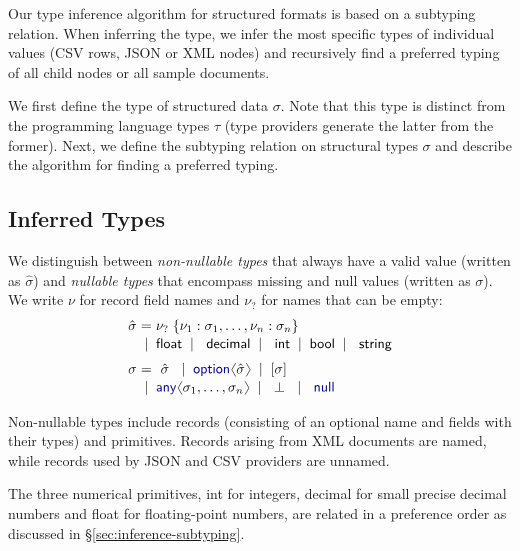 \documentclass[10pt,preprint,blind,clearpagebib]{sigplanconf}
\newcommand{\langl}{\begin{picture}(4.5,7)
\put(1.1,2.5){\rotatebox{60}{\line(1,0){5.5}}}
\put(1.1,2.5){\rotatebox{300}{\line(1,0){5.5}}}
\end{picture}}
\newcommand{\rangl}{\begin{picture}(4.5,7)
\put(.9,2.5){\rotatebox{120}{\line(1,0){5.5}}}
\put(.9,2.5){\rotatebox{240}{\line(1,0){5.5}}}
\end{picture}}
\newcommand{\kvd}[1]{\textnormal{\textcolor{kvdclr}{\sffamily #1}}}
\newcommand{\ident}[1]{\textnormal{\sffamily #1}}
\newcommand{\lsep}[0]{\;\; | \;\;}
\newcommand{\narrow}[1]{\hspace{-0.7em} #1 \hspace{-0.7em}}
\begin{document}
Our type inference algorithm for structured formats is based on a subtyping relation. When 
inferring the type, we infer the most specific types of individual values (CSV rows, JSON or XML 
nodes) and recursively find a preferred typing of all child nodes or all sample documents.

We first define the type of structured data $\sigma$. Note that this type is distinct 
from the programming language types $\tau$ (type providers generate the latter from the former). 
Next, we define the subtyping relation on structural types $\sigma$ and describe the algorithm 
for finding a preferred typing. 

\subsection{Inferred Types}
\label{sec:inference-types}

We distinguish between \emph{non-nullable types} that always have a valid value (written as 
$\hat{\sigma}$) and \emph{nullable types} that encompass missing and \kvd{null} values 
(written as $\sigma$). We write $\nu$ for record field names and $\nu_?$ for names that can be empty:
%
\begin{equation*}
\begin{array}{rcl}
 \hat{\sigma} &\narrow{=}& \nu_?\; \{ \nu_1 : \sigma_1, \ldots, \nu_n : \sigma_n \} \\[0.1em]
                &\narrow{|}& \ident{float} \lsep \ident{decimal} \lsep \ident{int} \lsep \ident{bool} \lsep \ident{string} 
 \\[0.6em] 
       \sigma &\narrow{=}& ~\hat{\sigma}~ \lsep \kvd{option}\langl \hat{\sigma} \rangl \lsep [\sigma] \\[0.1em]
              &\narrow{|}& \kvd{any}\langl\sigma_1, \ldots, \sigma_n\rangl \lsep ~\bot~ \lsep \kvd{null}
\end{array}
\end{equation*}

\noindent
Non-nullable types include records (consisting of an optional name and fields with their types) 
and primitives. Records arising from XML documents are named, while records used by 
JSON and CSV providers are unnamed. 

The three numerical primitives, \ident{int} for integers, \ident{decimal} for small precise decimal 
numbers and \ident{float} for floating-point numbers, are related in a preference order as discussed in 
\S\ref{sec:inference-subtyping}.
\end{document}
